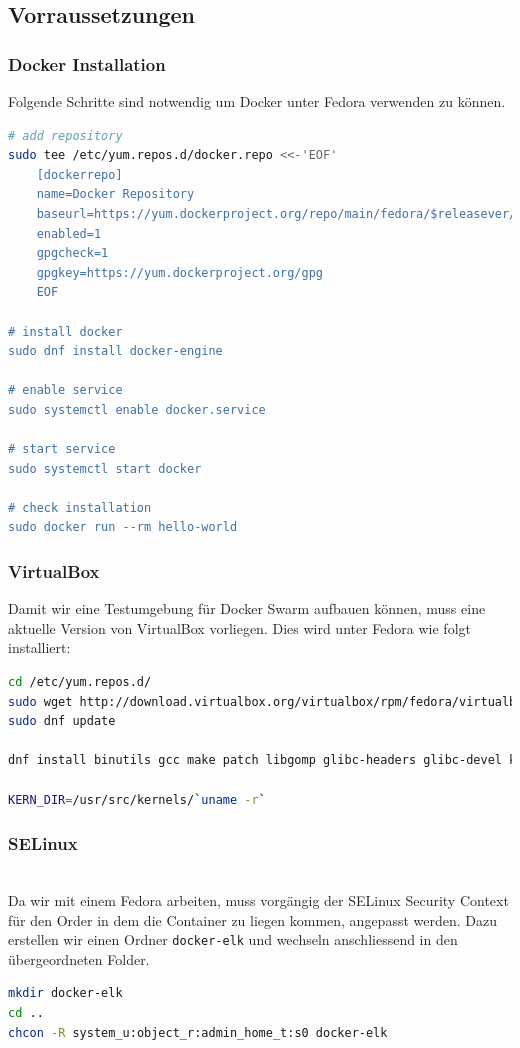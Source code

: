 \subsection{Vorraussetzungen}
\subsubsection{Docker Installation}
Folgende Schritte sind notwendig um Docker unter Fedora verwenden zu können.
\begin{lstlisting}[language=bash]
# add repository
sudo tee /etc/yum.repos.d/docker.repo <<-'EOF'
	[dockerrepo]
	name=Docker Repository
	baseurl=https://yum.dockerproject.org/repo/main/fedora/$releasever/
	enabled=1
	gpgcheck=1
	gpgkey=https://yum.dockerproject.org/gpg
	EOF

# install docker
sudo dnf install docker-engine

# enable service
sudo systemctl enable docker.service

# start service
sudo systemctl start docker

# check installation
sudo docker run --rm hello-world
\end{lstlisting}

\subsubsection{VirtualBox}
Damit wir eine Testumgebung für Docker Swarm aufbauen können, muss eine aktuelle Version von VirtualBox vorliegen.  Dies wird unter Fedora wie folgt installiert:
\begin{lstlisting}[language=bash]
cd /etc/yum.repos.d/ 
sudo wget http://download.virtualbox.org/virtualbox/rpm/fedora/virtualbox.repo
sudo dnf update

dnf install binutils gcc make patch libgomp glibc-headers glibc-devel kernel-headers kernel-devel dkms

KERN_DIR=/usr/src/kernels/`uname -r`
\end{lstlisting}


\subsubsection{SELinux} \hfill \\
Da wir mit einem Fedora arbeiten, muss vorgängig der SELinux Security Context für den Order in dem die Container zu liegen kommen, angepasst werden. Dazu erstellen wir einen Ordner \lstinline[]|docker-elk| und wechseln anschliessend in den übergeordneten Folder.
\begin{lstlisting}[language=bash]
mkdir docker-elk
cd ..
chcon -R system_u:object_r:admin_home_t:s0 docker-elk
\end{lstlisting}

